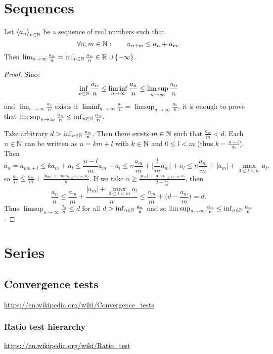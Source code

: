 \section{Sequences}

\begin{proposition} \label{FeketesLemma}
Let $\left\langle a_n \right\rangle_{n\in \mathbb{N}}$ be a sequence of real numbers such that
\[ \forall n,m\in \mathbb{N}: \qquad a_{n+m} \leq a_n+a_m. \]
Then $\lim_{n\to \infty} \frac{a_n}{n} = \inf_{n\in\mathbb{N}}\frac{a_n}{n} \in \mathbb{R}\cup\{-\infty\}$.
\end{proposition}
\begin{proof}
Since
\[ \inf_{n\in\mathbb{N}}\frac{a_n}{n} \leq \liminf_{n\to\infty}\frac{a_n}{n} \leq \limsup_{n\to\infty}\frac{a_n}{n} \]
and $\lim_{n\to \infty} \frac{a_n}{n}$ exists if $\liminf_{n\to\infty}\frac{a_n}{n} = \limsup_{n\to\infty}\frac{a_n}{n}$, it is enough to prove that $\limsup_{n\to\infty}\frac{a_n}{n} \leq \inf_{n\in\mathbb{N}}\frac{a_n}{n}$.

Take arbitrary $d > \inf_{n\in\mathbb{N}}\frac{a_n}{n}$. Then there exists $m\in\mathbb{N}$ such that $\frac{a_m}{m} < d$. Each $n\in \mathbb{N}$ can be written as $n = km+l$ with $k\in \mathbb{N}$ and $0\leq l < m$ (thus $k = \frac{n-l}{m}$). Then
\[ a_n = a_{km+l} \leq ka_m + a_l \leq \frac{n-l}{m}a_m + a_l \leq n\frac{a_m}{m} + \Big|\frac{l}{m}a_m\Big| + a_l \leq n\frac{a_m}{m} + |a_m| + \max_{0\leq l < m}a_l, \]
so $\frac{a_n}{n}\leq \frac{a_m}{m} + \frac{|a_m| + \max_{0\leq l < m}a_l}{n}$. If we take $n \geq \frac{|a_m| + \max_{0\leq l < m}a_l}{d - \frac{a_m}{m}}$, then
\[ \frac{a_n}{n}\leq \frac{a_m}{m} + \frac{|a_m| + \max_{0\leq l < m}a_l}{n} \leq \frac{a_m}{m} + \Big(d - \frac{a_m}{m}\Big) = d. \]
Thus $\limsup_{n\to\infty}\frac{a_n}{n} \leq d$ for all $d> \inf_{n\in\mathbb{N}}\frac{a_n}{n}$ and so $\limsup_{n\to\infty}\frac{a_n}{n} \leq \inf_{n\in\mathbb{N}}\frac{a_n}{n}$.
\end{proof}

\section{Series}

\subsection{Convergence tests}
\url{https://en.wikipedia.org/wiki/Convergence_tests}

\subsubsection{Ratio test hierarchy}
\url{https://en.wikipedia.org/wiki/Ratio_test}
